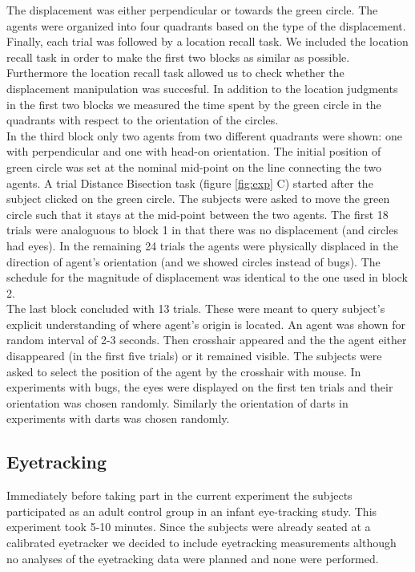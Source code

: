 \documentclass[10pt]{article}
\begin{document}
The displacement was either perpendicular or towards the green circle. 
The agents were organized into four quadrants based on the type of the displacement. 
Finally, each trial was followed by a location recall task. 
We included the location recall task in order to make the first two blocks as similar as possible. 
Furthermore the location recall task allowed us to check whether the displacement manipulation was succesful.
In addition to the location judgments in the first two blocks we measured the time spent by the green circle in the quadrants with respect to the orientation of the circles.\\
In the third block only two agents from two different quadrants were shown: one with perpendicular and one with head-on orientation. 
The initial position of green circle was set at the nominal mid-point on the line connecting the two agents. 
A trial Distance Bisection task (figure \ref{fig:exp} C) started after the subject clicked on the green circle. 
The subjects were asked to move the green circle such that it stays at the mid-point between the two agents. 
The first 18 trials were analoguous to block 1 in that there was no displacement (and circles had eyes). 
In the remaining 24 trials the agents were physically displaced in the direction of agent's orientation (and we showed circles instead of bugs). 
The schedule for the magnitude of displacement was identical to the one used in block 2.\\
The last block concluded with 13 trials. 
These were meant to query subject's explicit understanding of where agent's origin is located. 
An agent was shown for random interval of 2-3 seconds. 
Then crosshair appeared and the the agent either disappeared (in the first five trials) or it remained visible. 
The subjects were asked to select the position of the agent by the crosshair with mouse. 
In experiments with bugs, the eyes were displayed on the first ten trials and their orientation was chosen randomly. 
Similarly the orientation of darts in experiments with darts was chosen randomly.\\
 
\subsection*{Eyetracking}
Immediately before taking part in the current experiment the subjects participated as an adult control group in an infant eye-tracking study. 
This experiment took 5-10 minutes. 
Since the subjects were already seated at a calibrated eyetracker we decided to include eyetracking measurements although no analyses of the eyetracking data were planned and none were performed.
\end{document}
